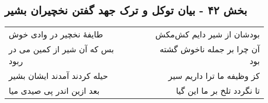 \begin{center}
\section*{بخش ۴۲ - بیان توکل و ترک جهد گفتن نخچیران بشیر}
\label{sec:sh042}
\begin{longtable}{l p{0.5cm} r}
طایفهٔ نخچیر در وادی خوش
&&
بودشان از شیر دایم کش‌مکش
\\
بس که آن شیر از کمین می در ربود
&&
آن چرا بر جمله ناخوش گشته بود
\\
حیله کردند آمدند ایشان بشیر
&&
کز وظیفه ما ترا داریم سیر
\\
بعد ازین اندر پی صیدی میا
&&
تا نگردد تلخ بر ما این گیا
\\
\end{longtable}
\end{center}
